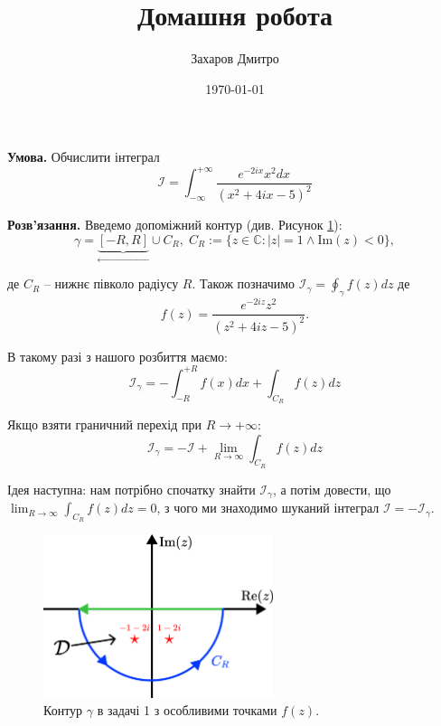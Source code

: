 \documentclass[oneside,solution]{karazin-complan-assign}
\title{Домашня робота}
\author{Захаров Дмитро}
\date{\today}
\begin{document}
\maketitle


\problem{}

\textbf{Умова.} Обчислити інтеграл
\begin{equation*}
    \mathcal{I} = \int_{-\infty}^{+\infty} \frac{e^{-2ix}x^2dx}{(x^2+4ix-5)^2}
\end{equation*}

\textbf{Розв'язання.} Введемо допоміжний контур (див. Рисунок \ref{fig:contour_1}):
\begin{equation}
    \gamma = \underbrace{[-R, R]}_{\xleftarrow{}} \cup C_R, \; C_R := \{z \in \mathbb{C}: |z|=1 \wedge \text{Im}(z) < 0\},
\end{equation}

де $C_R$ -- нижнє півколо радіусу $R$. Також позначимо $\mathcal{I}_{\gamma} = \oint_{\gamma} f(z)dz$ де
\begin{equation}
    f(z) = \frac{e^{-2iz}z^2}{(z^2+4iz-5)^2}.
\end{equation}

В такому разі з нашого розбиття маємо:
\begin{equation}
    \mathcal{I}_{\gamma} = -\int_{-R}^{+R} f(x)dx + \int_{C_R} f(z)dz 
\end{equation}

Якщо взяти граничний перехід при $R \to +\infty$:
\begin{equation}
    \mathcal{I}_{\gamma} = -\mathcal{I} + \lim_{R \to \infty} \int_{C_R} f(z)dz
\end{equation}

Ідея наступна: нам потрібно спочатку знайти $\mathcal{I}_{\gamma}$, а потім довести, що $\lim_{R \to \infty}\int_{C_R}f(z)dz=0$, з чого ми знаходимо шуканий інтеграл $\mathcal{I} = -\mathcal{I}_{\gamma}$. 

\begin{figure}
    \centering
    \includegraphics[width=0.6\textwidth]{images/hw_3/contour_1.pdf}
    \caption{Контур $\gamma$ в задачі 1 з особливими точками $f(z)$.}
    \label{fig:contour_1}
\end{figure}
\end{document}
